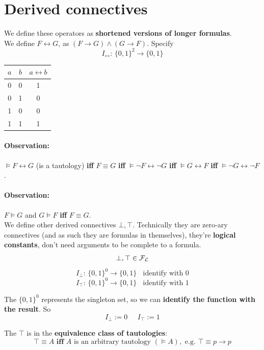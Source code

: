 	\section{Derived connectives}
	We define these operators as \textbf{shortened versions of longer formulas}.\\

	\noindent
	We define $F \leftrightarrow G$, as $(F \rightarrow G) \wedge (G \rightarrow F)$. Specify
	$$ I_\leftrightarrow: \, \{0,1\}^2 \rightarrow \{0,1\} $$
	\begin{center}
		\begin{tabular}{c c | c}
			$a$ & $b$ & $a \leftrightarrow b$ \\
			\hline
			0 & 0 & 1 \\
			0 & 1 & 0\\
			1 & 0 & 0\\
			1 & 1 & 1
		\end{tabular}
	\end{center}

	\paragraph{Observation:} $\models F \leftrightarrow G$ (is a tautology) \textbf{iff} $F \equiv G$ \textbf{iff} $\models \neg F \leftrightarrow \neg G$ \textbf{iff} $\models G \leftrightarrow F$ \textbf{iff} $\models \neg G \leftrightarrow \neg F$.\\

	\paragraph{Observation:} $F \models G$ and $G \models F$ \textbf{iff} $F \equiv G$.\\

	\noindent
	We define other derived connectives $\bot, \top$. Technically they are zero-ary connectives (and as such they are formulas in themselves), they're \textbf{logical constants}, don't need arguments to be complete to a formula.
	$$ \bot, \top \in \mathcal{F}_\mathcal{L} $$
	$$ I_\bot: \, \{0,1\}^0 \rightarrow \{0,1\}\;\; \text{ identify with } 0$$
	$$I_\top: \, \{0,1\}^0 \rightarrow \{0,1\} \;\; \text{ identify with } 1$$

	\noindent
	The $\{0,1\}^0$ represents the singleton set, so we can \textbf{identify the function with the result}. So
	$$ I_\bot := 0 \;\;\;\;\; I_\top := 1$$

	\noindent
	The $\top$ is in the \textbf{equivalence class of tautologies}:
	$$ \top \equiv A \textbf{ iff } A \text{ is an arbitrary tautology } (\models A), \text{ e.g. } \top \equiv p \rightarrow p$$

